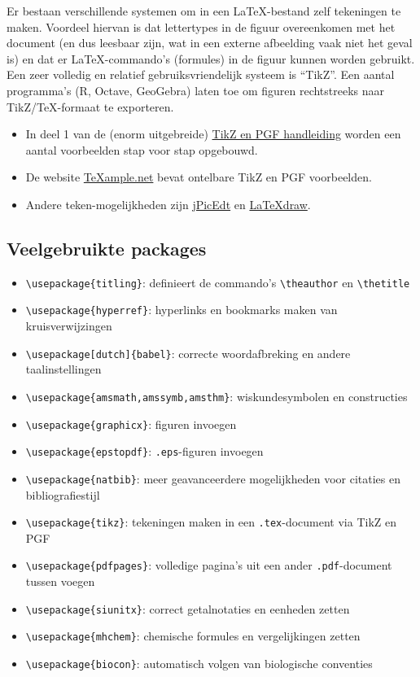 \documentclass[kulak]{kulakarticle} %
\begin{document}
Er bestaan verschillende systemen om in een \LaTeX-bestand zelf tekeningen te maken. Voordeel hiervan is dat lettertypes in de figuur overeenkomen met het document (en dus leesbaar zijn, wat in een externe afbeelding vaak niet het geval is) en dat er \LaTeX-commando's (formules) in de figuur kunnen worden gebruikt.
Een zeer volledig en relatief gebruiksvriendelijk systeem is ``TikZ''. Een aantal programma's (R, Octave, GeoGebra) laten toe om figuren rechtstreeks naar TikZ/TeX-formaat te exporteren.

\begin{itemize}
	\item In deel 1 van de (enorm uitgebreide) \href{https://mirror.lyrahosting.com/CTAN/graphics/pgf/base/doc/pgfmanual.pdf}{TikZ en PGF handleiding} worden een aantal voorbeelden stap voor stap opgebouwd.
	\item De website
	      \href{http://www.texample.net/tikz/examples/all/}{TeXample.net} bevat ontelbare TikZ en PGF voorbeelden.
	\item Andere teken-mogelijkheden zijn	\href{http://jpicedt.sourceforge.net/}{jPicEdt} en
	      \href{http://latexdraw.sourceforge.net/}{LaTeXdraw}.
\end{itemize}

\subsection{Veelgebruikte packages}
\begin{itemize}
	\item \verb+\usepackage{titling}+: definieert de commando's \verb+\theauthor+ en \verb+\thetitle+
	\item \verb+\usepackage{hyperref}+: hyperlinks en bookmarks maken van kruisverwijzingen
	\item \verb+\usepackage[dutch]{babel}+: correcte woordafbreking en andere taalinstellingen
	\item \verb+\usepackage{amsmath,amssymb,amsthm}+: wiskundesymbolen en constructies
	\item \verb+\usepackage{graphicx}+: figuren invoegen
	\item \verb+\usepackage{epstopdf}+: \texttt{.eps}-figuren invoegen
	\item \verb+\usepackage{natbib}+: meer geavanceerdere mogelijkheden voor citaties en bibliografiestijl
	\item \verb+\usepackage{tikz}+: tekeningen maken in een \texttt{.tex}-document via TikZ en PGF
	\item \verb+\usepackage{pdfpages}+: volledige pagina's uit een ander \texttt{.pdf}-document tussen voegen
	\item \verb+\usepackage{siunitx}+: correct getalnotaties en eenheden zetten
	\item \verb+\usepackage{mhchem}+: chemische formules en vergelijkingen zetten
	\item \verb+\usepackage{biocon}+: automatisch volgen van biologische conventies
\end{itemize}
\end{document}
